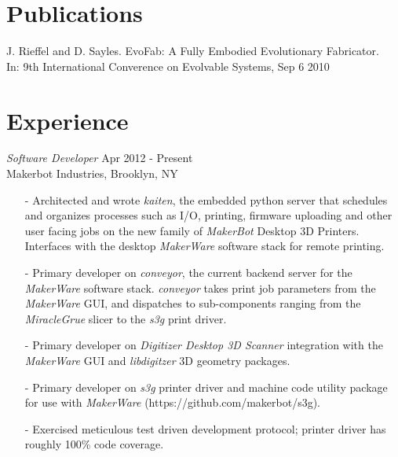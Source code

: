 \documentclass[margin, 10pt]{res} %
\begin{document}
\begin{resume}
 
\section{Publications}
J. Rieffel and D. Sayles. EvoFab: A Fully Embodied Evolutionary Fabricator.  \\In: 9th International Converence on Evolvable Systems, Sep 6 2010 \\

 
\section{Experience}

{\sl Software Developer} \hfill Apr 2012 - Present \\
Makerbot Industries, Brooklyn, NY
\begin{itemize} \itemsep -2pt
\item[-] Architected and wrote \textit{kaiten}, the embedded python server that schedules and organizes processes such as I/O, printing, firmware uploading and other user facing jobs on the new family of \textit{MakerBot} Desktop 3D Printers.  Interfaces with the desktop \textit{MakerWare} software stack for remote printing.
\item[-] Primary developer on \textit{conveyor}, the current backend server for the \textit{MakerWare} software stack.  \textit{conveyor} takes print job parameters from the \textit{MakerWare} GUI, and dispatches to sub-components ranging from the \textit{MiracleGrue} slicer to the \textit{s3g} print driver.
\item[-] Primary developer on \textit{Digitizer Desktop 3D Scanner} integration with the \textit{MakerWare} GUI and \textit{libdigitzer} 3D geometry packages.
\item[-] Primary developer on \textit{s3g} printer driver and machine code utility package for use with \textit{MakerWare} (https://github.com/makerbot/s3g).
\item[-] Exercised meticulous test driven development protocol; printer driver has roughly 100\% code coverage.
\end{itemize}


\end{resume}
\end{document}
